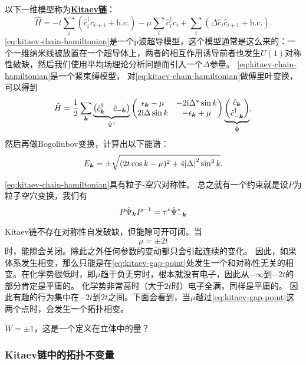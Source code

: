 \documentclass[hyperref, UTF8, a4paper]{ctexart}
\newcommand*{\ii}{\mathrm{i}}
\newcommand*{\concept}[1]{\underline{\textbf{#1}}}
\begin{document}
以下一维模型称为\concept{Kitaev链}：
\begin{equation}
    \hat{H} = - t \sum_i (\hat{c}_i^\dagger \hat{c}_{i+1} + \text{h.c.}) - \mu \sum_i \hat{c}_i^\dagger \hat{c}_i + \sum_i (\Delta \hat{c}_i \hat{c}_{i+1} + \text{h.c.} ).
    \label{eq:kitaev-chain-hamiltonian}
\end{equation}
\eqref{eq:kitaev-chain-hamiltonian}是一个p波超导模型，这个模型通常是这么来的：一个一维纳米线被放置在一个超导体上，两者的相互作用诱导前者也发生$U(1)$对称性破缺，然后我们使用平均场理论分析问题而引入一个$\Delta$参量。
\eqref{eq:kitaev-chain-hamiltonian}是一个紧束缚模型，
对\eqref{eq:kitaev-chain-hamiltonian}做傅里叶变换，可以得到
\begin{equation}
    \hat{H} = \frac{1}{2} \sum_{\vb*{k}} \underbrace{\pmqty{\hat{c}^\dagger_{\vb*{k}} & \hat{c}_{-\vb*{k}}}}_{\hat{\Psi}^\dagger} \pmqty{\epsilon_{\vb*{k}} - \mu & -2 \ii \Delta^* \sin k \\ 2 \ii \Delta \sin k & - \epsilon_{\vb*{k}} + \mu} \underbrace{\pmqty{\hat{c}_{\vb*{k}} \\ \hat{c}^\dagger_{-\vb*{k}}}}_{\hat{\Psi}},
\end{equation}
然后再做Bogoliubov变换，计算出以下能谱：
\begin{equation}
    E_{\vb*{k}} = \pm \sqrt{(2t \cos k - \mu)^2 + 4 \abs{\Delta}^2 \sin^2 k}.
\end{equation}

\eqref{eq:kitaev-chain-hamiltonian}具有粒子-空穴对称性。%
总之就有一个约束就是设$P$为粒子空穴变换，我们有
\[
    P \hat{\Psi}_{\vb*{k}} P^{-1} = \tau^* \hat{\Psi}_{-\vb*{k}}^*
\]

Kitaev链不存在对称性自发破缺，但能隙可开可闭。当
\begin{equation}
    \mu = \pm 2t
    \label{eq:kitaev-gap-point}
\end{equation}
时，能隙会关闭。除此之外任何参数的变动都只会引起连续的变化。
因此，如果体系发生相变，那么只能是在\eqref{eq:kitaev-gap-point}处发生一个和对称性无关的相变。在化学势很低时，即$\mu$趋于负无穷时，根本就没有电子，因此从$-\infty$到$-2t$的部分肯定是平庸的。
化学势非常高时（大于$2t$时）电子全满，同样是平庸的。
因此有趣的行为集中在$-2t$到$2t$之间。下面会看到，当$\mu$越过\eqref{eq:kitaev-gap-point}这两个点时，会发生一个拓扑相变。

$W = \pm 1$，这是一个定义在立体中的量？

\subsubsection{Kitaev链中的拓扑不变量}
\end{document}
